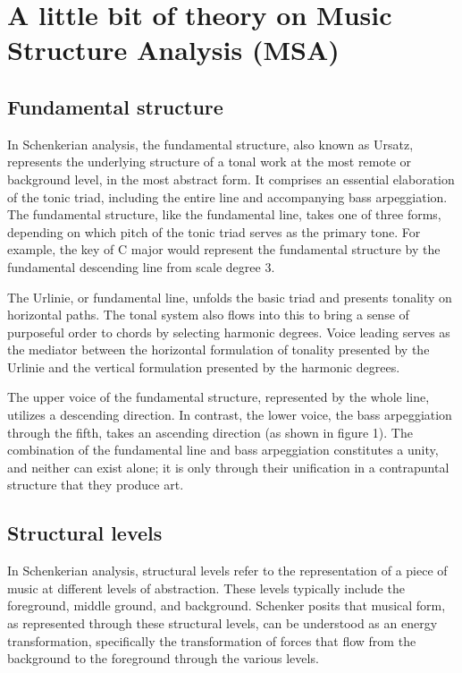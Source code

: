 \chapter{A little bit of theory on Music Structure Analysis (MSA)}

\section{Fundamental structure}

In Schenkerian analysis, the fundamental structure, also known as Ursatz, represents the underlying structure of a tonal work at the most remote or background level, in the most abstract form. It comprises an essential elaboration of the tonic triad, including the entire line and accompanying bass arpeggiation. The fundamental structure, like the fundamental line, takes one of three forms, depending on which pitch of the tonic triad serves as the primary tone. For example, the key of C major would represent the fundamental structure by the fundamental descending line from scale degree 3.

The Urlinie, or fundamental line, unfolds the basic triad and presents tonality on horizontal paths. The tonal system also flows into this to bring a sense of purposeful order to chords by selecting harmonic degrees. Voice leading serves as the mediator between the horizontal formulation of tonality presented by the Urlinie and the vertical formulation presented by the harmonic degrees.

The upper voice of the fundamental structure, represented by the whole line, utilizes a descending direction. In contrast, the lower voice, the bass arpeggiation through the fifth, takes an ascending direction (as shown in figure 1). The combination of the fundamental line and bass arpeggiation constitutes a unity, and neither can exist alone; it is only through their unification in a contrapuntal structure that they produce art.

\section{Structural levels}

In Schenkerian analysis, structural levels refer to the representation of a piece of music at different levels of abstraction. These levels typically include the foreground, middle ground, and background. Schenker posits that musical form, as represented through these structural levels, can be understood as an energy transformation, specifically the transformation of forces that flow from the background to the foreground through the various levels.


